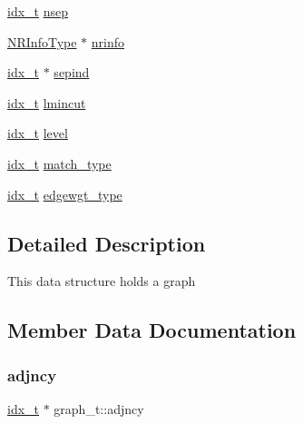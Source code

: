 \begin{DoxyCompactItemize}
\item 
\hyperlink{a00876_aaa5262be3e700770163401acb0150f52}{idx\+\_\+t} \hyperlink{a00734_a723e8c2de97704284f492b53c21e9fad}{nsep}
\item 
\hyperlink{a00978_a6393d515f02fcdaf17a06297a8db5bbb}{N\+R\+Info\+Type} $\ast$ \hyperlink{a00734_a2ee093704fdbad45e3108505bbd29594}{nrinfo}
\item 
\hyperlink{a00876_aaa5262be3e700770163401acb0150f52}{idx\+\_\+t} $\ast$ \hyperlink{a00734_ad3013a301ba5be9f81a8b53667d16c3d}{sepind}
\item 
\hyperlink{a00876_aaa5262be3e700770163401acb0150f52}{idx\+\_\+t} \hyperlink{a00734_a92aa28928a30f09c684bea12ae2a5a9e}{lmincut}
\item 
\hyperlink{a00876_aaa5262be3e700770163401acb0150f52}{idx\+\_\+t} \hyperlink{a00734_a8ee3c5b86b691e2c96f78bffec6d46f2}{level}
\item 
\hyperlink{a00876_aaa5262be3e700770163401acb0150f52}{idx\+\_\+t} \hyperlink{a00734_a674a01b43ab31ef9196cf4f24ac75452}{match\+\_\+type}
\item 
\hyperlink{a00876_aaa5262be3e700770163401acb0150f52}{idx\+\_\+t} \hyperlink{a00734_ae70d9595efe0791ad2585b7a54ff1f6b}{edgewgt\+\_\+type}
\end{DoxyCompactItemize}


\subsection{Detailed Description}
This data structure holds a graph 

\subsection{Member Data Documentation}
\mbox{\label{a00734_a0301c5a80081df93c122992f779ded24}} 
\subsubsection{\texorpdfstring{adjncy}{adjncy}}
{\footnotesize\ttfamily \hyperlink{a00876_aaa5262be3e700770163401acb0150f52}{idx\+\_\+t} $\ast$ graph\+\_\+t\+::adjncy}

\mbox{\label{a00734_acad756362a4703fefde4e7cbca8f46f8}} 
